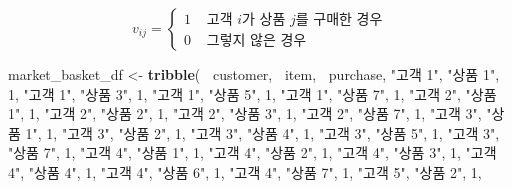 \documentclass[]{book}
\newenvironment{Shaded}{\begin{snugshade}}{\end{snugshade}}
\newcommand{\DecValTok}[1]{\textcolor[rgb]{0.00,0.00,0.81}{#1}}
\newcommand{\KeywordTok}[1]{\textcolor[rgb]{0.13,0.29,0.53}{\textbf{#1}}}
\newcommand{\NormalTok}[1]{#1}
\newcommand{\OperatorTok}[1]{\textcolor[rgb]{0.81,0.36,0.00}{\textbf{#1}}}
\newcommand{\StringTok}[1]{\textcolor[rgb]{0.31,0.60,0.02}{#1}}
\begin{document}
\begin{equation*}
v_{ij} = \begin{cases}
1 & \text{ 고객 $i$가 상품 $j$를 구매한 경우}\\
0 & \text{ 그렇지 않은 경우}
\end{cases}
\end{equation*}

\begin{Shaded}
\begin{Highlighting}[]
\NormalTok{market_basket_df <-}\StringTok{ }\KeywordTok{tribble}\NormalTok{(}
  \OperatorTok{~}\NormalTok{customer, }\OperatorTok{~}\NormalTok{item, }\OperatorTok{~}\NormalTok{purchase,}
  \StringTok{"고객 1"}\NormalTok{, }\StringTok{"상품 1"}\NormalTok{, }\DecValTok{1}\NormalTok{,}
  \StringTok{"고객 1"}\NormalTok{, }\StringTok{"상품 3"}\NormalTok{, }\DecValTok{1}\NormalTok{,}
  \StringTok{"고객 1"}\NormalTok{, }\StringTok{"상품 5"}\NormalTok{, }\DecValTok{1}\NormalTok{,}
  \StringTok{"고객 1"}\NormalTok{, }\StringTok{"상품 7"}\NormalTok{, }\DecValTok{1}\NormalTok{,}
  \StringTok{"고객 2"}\NormalTok{, }\StringTok{"상품 1"}\NormalTok{, }\DecValTok{1}\NormalTok{,}
  \StringTok{"고객 2"}\NormalTok{, }\StringTok{"상품 2"}\NormalTok{, }\DecValTok{1}\NormalTok{,}
  \StringTok{"고객 2"}\NormalTok{, }\StringTok{"상품 3"}\NormalTok{, }\DecValTok{1}\NormalTok{,}
  \StringTok{"고객 2"}\NormalTok{, }\StringTok{"상품 7"}\NormalTok{, }\DecValTok{1}\NormalTok{,}
  \StringTok{"고객 3"}\NormalTok{, }\StringTok{"상품 1"}\NormalTok{, }\DecValTok{1}\NormalTok{,}
  \StringTok{"고객 3"}\NormalTok{, }\StringTok{"상품 2"}\NormalTok{, }\DecValTok{1}\NormalTok{,}
  \StringTok{"고객 3"}\NormalTok{, }\StringTok{"상품 4"}\NormalTok{, }\DecValTok{1}\NormalTok{,}
  \StringTok{"고객 3"}\NormalTok{, }\StringTok{"상품 5"}\NormalTok{, }\DecValTok{1}\NormalTok{,}
  \StringTok{"고객 3"}\NormalTok{, }\StringTok{"상품 7"}\NormalTok{, }\DecValTok{1}\NormalTok{,}
  \StringTok{"고객 4"}\NormalTok{, }\StringTok{"상품 1"}\NormalTok{, }\DecValTok{1}\NormalTok{,}
  \StringTok{"고객 4"}\NormalTok{, }\StringTok{"상품 2"}\NormalTok{, }\DecValTok{1}\NormalTok{,}
  \StringTok{"고객 4"}\NormalTok{, }\StringTok{"상품 3"}\NormalTok{, }\DecValTok{1}\NormalTok{,}
  \StringTok{"고객 4"}\NormalTok{, }\StringTok{"상품 4"}\NormalTok{, }\DecValTok{1}\NormalTok{,}
  \StringTok{"고객 4"}\NormalTok{, }\StringTok{"상품 6"}\NormalTok{, }\DecValTok{1}\NormalTok{,}
  \StringTok{"고객 4"}\NormalTok{, }\StringTok{"상품 7"}\NormalTok{, }\DecValTok{1}\NormalTok{,}
  \StringTok{"고객 5"}\NormalTok{, }\StringTok{"상품 2"}\NormalTok{, }\DecValTok{1}\NormalTok{,}

\end{Highlighting}
\end{Shaded}
\end{document}
